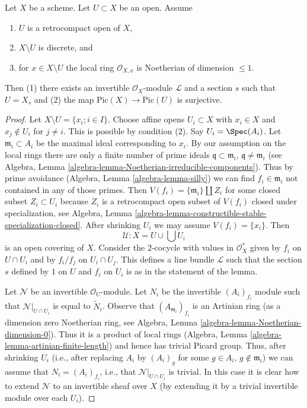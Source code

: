 \begin{lemma}
\label{lemma-complement-codim-1-closed-points}
Let $X$ be a scheme. Let $U \subset X$ be an open. Assume
\begin{enumerate}
\item $U$ is a retrocompact open of $X$,
\item $X \setminus U$ is discrete, and
\item for $x \in X \setminus U$ the local ring
$\mathcal{O}_{X, x}$ is Noetherian of dimension $\leq 1$.
\end{enumerate}
Then (1) there exists an invertible $\mathcal{O}_X$-module $\mathcal{L}$
and a section $s$ such that $U = X_s$ and (2) the map
$\text{Pic}(X) \to \text{Pic}(U)$ is surjective.
\end{lemma}

\begin{proof}
Let $X \setminus U = \{x_i; i \in I\}$.
Choose affine opens $U_i \subset X$ with $x_i \in X$ and
$x_j \not \in U_i$ for $j \not = i$. This is possible by condition (2).
Say $U_i = \Spec(A_i)$. Let $\mathfrak m_i \subset A_i$ be the maximal
ideal corresponding to $x_i$. By our assumption on the local rings
there are only a finite number of prime ideals
$\mathfrak q \subset \mathfrak m_i$,
$\mathfrak q \not = \mathfrak m_i$ (see
Algebra, Lemma \ref{algebra-lemma-Noetherian-irreducible-components}).
Thus by prime avoidance (Algebra, Lemma
\ref{algebra-lemma-silly}) we can find $f_i \in \mathfrak m_i$
not contained in any of those primes. Then
$V(f_i) = \{\mathfrak m_i\} \amalg Z_i$ for some closed subset
$Z_i \subset U_i$ because $Z_i$ is a retrocompact open subset of
$V(f_i)$ closed under specialization, see
Algebra, Lemma \ref{algebra-lemma-constructible-stable-specialization-closed}.
After shrinking $U_i$ we may assume $V(f_i) = \{x_i\}$. Then
$$
\mathcal{U} : X = U \cup \bigcup U_i
$$
is an open covering of $X$. Consider the $2$-cocycle with values
in $\mathcal{O}_X^*$ given by $f_i$ on $U \cap U_i$ and by
$f_i/f_j$ on $U_i \cap U_j$. This defines a line bundle
$\mathcal{L}$ such that the section $s$ defined by $1$ on $U$
and $f_i$ on $U_i$ is as in the statement of the lemma.

\medskip\noindent
Let $\mathcal{N}$ be an invertible $\mathcal{O}_U$-module.
Let $N_i$ be the invertible $(A_i)_{f_i}$ module such that
$\mathcal{N}|_{U \cap U_i}$ is equal to $\tilde N_i$.
Observe that $(A_{\mathfrak m_i})_{f_i}$ is an Artinian ring
(as a dimension zero Noetherian ring, see
Algebra, Lemma \ref{algebra-lemma-Noetherian-dimension-0}).
Thus it is a product of local rings
(Algebra, Lemma \ref{algebra-lemma-artinian-finite-length}) and
hence has trivial Picard group. Thus, after shrinking $U_i$
(i.e., after replacing $A_i$ by $(A_i)_g$ for some $g \in A_i$,
$g \not \in \mathfrak m_i$)
we can assume that $N_i = (A_i)_{f_i}$, i.e., that
$\mathcal{N}|_{U \cap U_i}$ is trivial. In this case it is
clear how to extend $\mathcal{N}$ to an invertible sheaf over $X$
(by extending it by a trivial invertible module over each $U_i$).
\end{proof}

